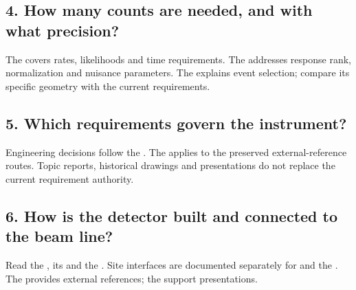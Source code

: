 \documentclass[11pt,a4paper]{article}
\begin{document}
\subsection*{4. How many counts are needed, and with what precision?}
The  covers rates, likelihoods and time requirements. The  addresses response rank, normalization and nuisance parameters. The  explains event selection; compare its specific geometry with the current requirements.

\subsection*{5. Which requirements govern the instrument?}
Engineering decisions follow the . The  applies to the preserved external-reference routes. Topic reports, historical drawings and presentations do not replace the current requirement authority.

\subsection*{6. How is the detector built and connected to the beam line?}
Read the , its  and the . Site interfaces are documented separately for  and the . The  provides external references; the  support presentations.

\clearpage
\begingroup\small
\end{document}
